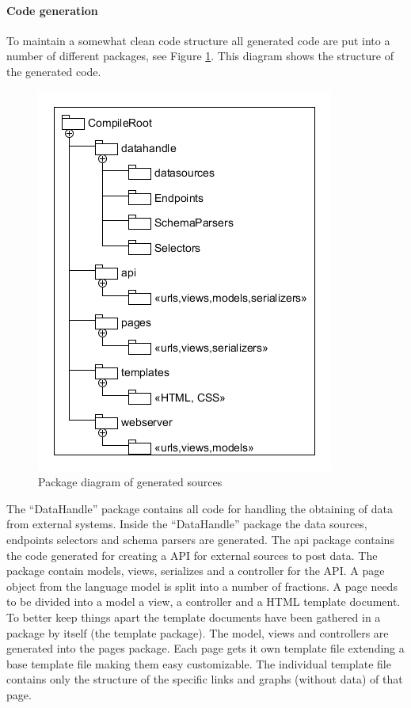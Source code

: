 \paragraph{Code generation}
To maintain a somewhat clean code structure all generated code are put into a number of different
packages, see Figure \ref{fig:packagediagram}.
This diagram shows the structure of the generated code.
\begin{figure}
\begin{center}
\includegraphics[width=\linewidth]{images/PackageDiagram}
\end{center}
\caption{Package diagram of generated sources}
\label{fig:packagediagram}
\end{figure}
The ``DataHandle'' package contains all code for handling the obtaining of data from external
systems. 
Inside the ``DataHandle'' package the data sources, endpoints selectors and schema parsers are
generated.
The api package contains the code generated for creating a API for external sources to post data.
The package contain models, views, serializes and a controller for the API.
A page object from the language model is split into a number of fractions.
A page needs to be divided into a model a view, a controller and a HTML template document.
To better keep things apart the template documents have been gathered in a package by itself (the template package).
The model, views and controllers are generated into the pages package.
Each page gets it own template file extending a base template file making them easy customizable.
The individual template file contains only the structure of the specific links and graphs (without data) of that page.

